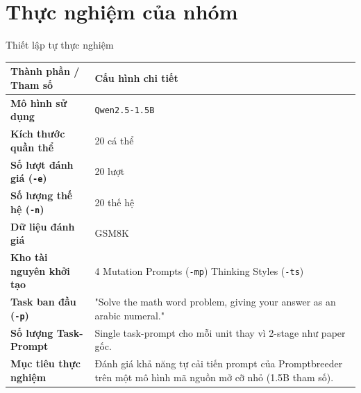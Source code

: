 \documentclass[english,main=vietnamese,xcolor=table]{beamer}
\begin{document}
\section{Thực nghiệm của nhóm}

\begin{frame}{Thiết lập tự thực nghiệm}
\small
\renewcommand{\arraystretch}{1.25} %
\centering

\begin{tabular}{|l|p{7cm}|}
\hline
\rowcolor{blue!20} \textbf{Thành phần / Tham số} & \textbf{Cấu hình chi tiết} \\ \hline
\textbf{Mô hình sử dụng} & \texttt{Qwen2.5-1.5B}\\ \hline
\textbf{Kích thước quần thể} & 20 cá thể \\ \hline
\textbf{Số lượt đánh giá (\texttt{-e})} & 20 lượt \\ \hline
\textbf{Số lượng thế hệ (\texttt{-n})} & 20 thế hệ \\ \hline
\textbf{Dữ liệu đánh giá } & GSM8K \\ \hline
\textbf{Kho tài nguyên khởi tạo} & 4 Mutation Prompts (\texttt{-mp}) 
\newline 5 Thinking Styles (\texttt{-ts}) \\ \hline
\textbf{Task ban đầu (\texttt{-p})} & "Solve the math word problem, giving your answer as an arabic numeral." \\ \hline
\textbf{Số lượng Task-Prompt} & Single task-prompt cho mỗi unit thay vì 2-stage như paper gốc.\\ \hline
\textbf{Mục tiêu thực nghiệm} & Đánh giá khả năng tự cải tiến prompt của Promptbreeder trên một mô hình mã nguồn mở cỡ nhỏ (1.5B tham số). \\ \hline
\end{tabular}

\end{frame}
\end{document}
